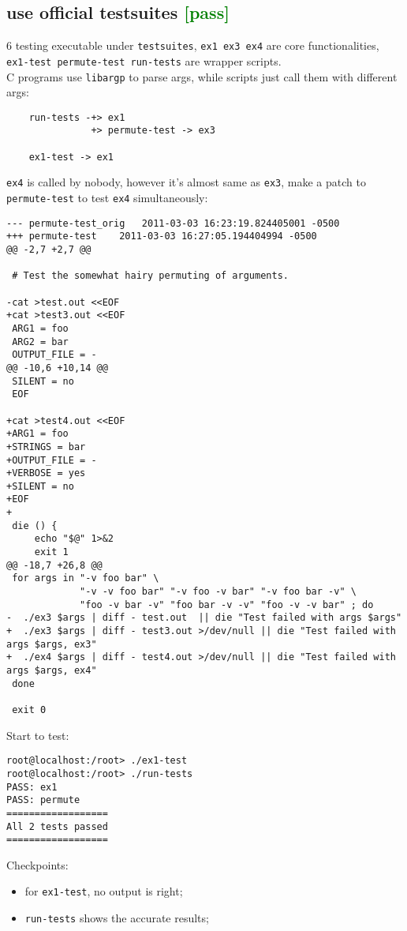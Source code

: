 \documentclass[a4paper]{report}
\begin{document}
\subsection{use official testsuites \textcolor{green}{[pass]}}
6 testing executable under {\tt testsuites}, 
{\tt ex1 ex3 ex4} are core functionalities, {\tt ex1-test permute-test run-tests}
are wrapper scripts.\\
C programs use {\tt libargp} to parse args, while scripts just call them
with different args:
\begin{lstlisting}
    run-tests -+> ex1
               +> permute-test -> ex3

    ex1-test -> ex1
\end{lstlisting}
{\tt ex4} is called by nobody, however it's almost same as {\tt ex3}, make a patch
to {\tt permute-test} to test {\tt ex4} simultaneously:
\begin{lstlisting}
--- permute-test_orig	2011-03-03 16:23:19.824405001 -0500
+++ permute-test	2011-03-03 16:27:05.194404994 -0500
@@ -2,7 +2,7 @@
 
 # Test the somewhat hairy permuting of arguments.
 
-cat >test.out <<EOF
+cat >test3.out <<EOF
 ARG1 = foo
 ARG2 = bar
 OUTPUT_FILE = -
@@ -10,6 +10,14 @@
 SILENT = no
 EOF
 
+cat >test4.out <<EOF
+ARG1 = foo
+STRINGS = bar
+OUTPUT_FILE = -
+VERBOSE = yes
+SILENT = no
+EOF
+
 die () {
     echo "$@" 1>&2
     exit 1
@@ -18,7 +26,8 @@
 for args in "-v foo bar" \
             "-v -v foo bar" "-v foo -v bar" "-v foo bar -v" \
             "foo -v bar -v" "foo bar -v -v" "foo -v -v bar" ; do
-  ./ex3 $args | diff - test.out  || die "Test failed with args $args"
+  ./ex3 $args | diff - test3.out >/dev/null || die "Test failed with args $args, ex3"
+  ./ex4 $args | diff - test4.out >/dev/null || die "Test failed with args $args, ex4"
 done
 
 exit 0
\end{lstlisting}
Start to test:
\begin{lstlisting}
root@localhost:/root> ./ex1-test 
root@localhost:/root> ./run-tests 
PASS: ex1
PASS: permute
==================
All 2 tests passed
==================
\end{lstlisting}
Checkpoints:
\begin{itemize}
    \item for {\tt ex1-test}, no output is right;
    \item {\tt run-tests} shows the accurate results;
\end{itemize}
\end{document}
